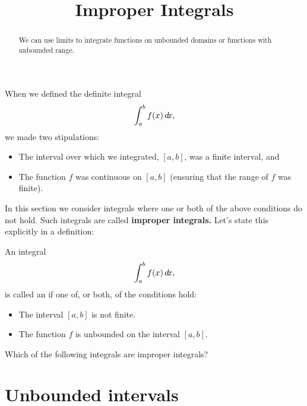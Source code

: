 \documentclass{ximera}
\title[Dig-In:]{Improper Integrals}
\begin{document}
\begin{abstract}
  We can use limits to integrate functions on unbounded domains or functions with unbounded range.
\end{abstract}
\maketitle


When we defined the definite integral
\[
\int_a^b f(x) \mathop{}\!d\! x,
\]
we made two stipulations:
\begin{itemize}
\item The interval over which we integrated, $[a,b]$, was a finite
  interval, and
\item The function $f$ was continuous on $[a,b]$ (ensuring that the
  range of $f$ was finite).
\end{itemize}

In this section we consider integrals where one or both of the above
conditions do not hold. Such integrals are called \textbf{improper
  integrals.} Let's state this explicitly in a definition:


\begin{definition}
  An integral
  \[
  \int_a^b f(x) \mathop{}\!d\! x,
  \]
  is called an  if one of, or both, of the conditions hold:
  \begin{itemize}
  \item The interval $[a,b]$ is not finite.
  \item The function $f$ is unbounded on the interval $[a,b]$.
  \end{itemize}
\end{definition}

\begin{question}
  Which of the following integrals are improper integrals?
  \begin{selectAll}
  \end{selectAll}
\end{question}



\section{Unbounded intervals}
\end{document}
